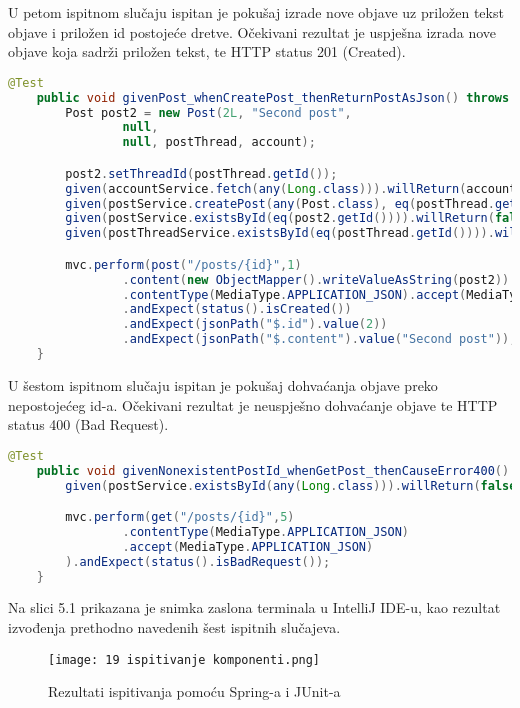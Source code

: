 			U petom ispitnom slučaju ispitan je pokušaj izrade nove objave uz priložen tekst objave i priložen id postojeće dretve. Očekivani rezultat je uspješna izrada nove objave koja sadrži priložen tekst, te HTTP status 201 (Created).

			\begin{lstlisting}[language=Java, breaklines=true]
    @Test
    public void givenPost_whenCreatePost_thenReturnPostAsJson() throws Exception {
        Post post2 = new Post(2L, "Second post",
                null,
                null, postThread, account);

        post2.setThreadId(postThread.getId());
        given(accountService.fetch(any(Long.class))).willReturn(account);
        given(postService.createPost(any(Post.class), eq(postThread.getId()))).willReturn(post2);
        given(postService.existsById(eq(post2.getId()))).willReturn(false);
        given(postThreadService.existsById(eq(postThread.getId()))).willReturn(true);

        mvc.perform(post("/posts/{id}",1)
                .content(new ObjectMapper().writeValueAsString(post2))
                .contentType(MediaType.APPLICATION_JSON).accept(MediaType.APPLICATION_JSON))
                .andExpect(status().isCreated())
                .andExpect(jsonPath("$.id").value(2))
                .andExpect(jsonPath("$.content").value("Second post"));
    }
			\end{lstlisting}

			U šestom ispitnom slučaju ispitan je pokušaj dohvaćanja objave preko nepostojećeg id-a.
			Očekivani rezultat je neuspješno dohvaćanje objave te HTTP status 400 (Bad Request).

			\begin{lstlisting}[language=Java, breaklines=true]
    @Test
    public void givenNonexistentPostId_whenGetPost_thenCauseError400() throws Exception {
        given(postService.existsById(any(Long.class))).willReturn(false);

        mvc.perform(get("/posts/{id}",5)
                .contentType(MediaType.APPLICATION_JSON)
                .accept(MediaType.APPLICATION_JSON)
        ).andExpect(status().isBadRequest());
    }
			\end{lstlisting}

			Na slici 5.1 prikazana je snimka zaslona terminala u IntelliJ IDE-u, kao rezultat izvođenja prethodno navedenih šest ispitnih slučajeva.

			\begin{figure}[H]
					\centering
					\texttt{[image: 19 ispitivanje komponenti.png]}
					\caption{Rezultati ispitivanja pomoću Spring-a i JUnit-a}
				\end{figure}
			\eject

